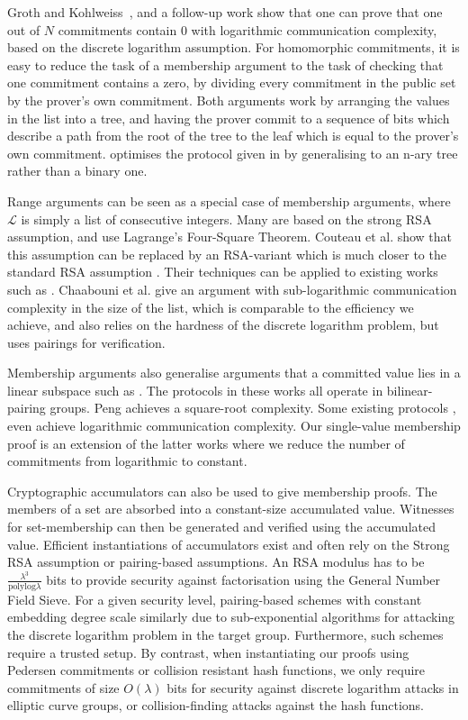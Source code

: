 Groth and Kohlweiss~\cite{GrothK15}, and a follow-up work \cite{BootleCCGGP15} show that one can prove that one out of $N$ commitments contain $0$ with logarithmic communication complexity, based on the discrete logarithm assumption. For homomorphic commitments, it is easy to reduce the task of a membership argument to the task of checking that one commitment contains a zero, by dividing every commitment in the public set by the prover's own commitment. Both arguments work by arranging the values in the list into a tree, and having the prover commit to a sequence of bits which describe a path from the root of the tree to the leaf which is equal to the prover's own commitment. \cite{BootleCCGGP15} optimises the protocol given in \cite{GrothK15} by generalising to an n-ary tree rather than a binary one.

Range arguments can be seen as a special case of membership arguments, where $\mathcal{L}$ is simply a list of consecutive integers. Many are based on the strong RSA assumption, and use Lagrange's Four-Square Theorem. Couteau et al. show that this assumption can be replaced by an RSA-variant which is much closer to the standard RSA assumption \cite{CouteauPP17}. Their techniques can be applied to existing works such as \cite{Groth05,Lip03}. Chaabouni et al.  \cite{Chaabouni2010} give an argument with sub-logarithmic communication complexity in the size of the list, which is comparable to the efficiency we achieve, and also relies on the hardness of the discrete logarithm problem, but uses pairings for verification.

Membership arguments also generalise arguments that a committed value lies in a linear subspace such as \cite{Jutla2013,Jutla2014,Kiltz2015}. The protocols in these works all operate in bilinear-pairing groups. Peng \cite{Peng2012} achieves a square-root complexity. Some existing protocols \cite{BayerG13}, \cite{GrothK15} even achieve logarithmic communication complexity. Our single-value membership proof is an extension of the latter works where we reduce the number of commitments from logarithmic to constant.

Cryptographic accumulators \cite{Benaloh1994,Ngu05,Camenisch2009,Camenisch2002} can also be used to give membership proofs. The members of a set are absorbed into a constant-size accumulated value. Witnesses for set-membership can then be generated and verified using the accumulated value. Efficient instantiations of accumulators exist and often rely on the Strong RSA assumption or pairing-based assumptions. An RSA modulus has to be $\frac{\lambda^3}{\mathrm{polylog}\lambda}$ bits to provide security against factorisation using the General Number Field Sieve. For a given security level, pairing-based schemes with constant embedding degree scale similarly due to sub-exponential algorithms for attacking the discrete logarithm problem in the target group. Furthermore, such schemes require a trusted setup. By contrast, when instantiating our proofs using Pedersen commitments or collision resistant hash functions, we only require commitments of size $O(\lambda)$ bits for security against discrete logarithm attacks in elliptic curve groups, or collision-finding attacks against the hash functions.

